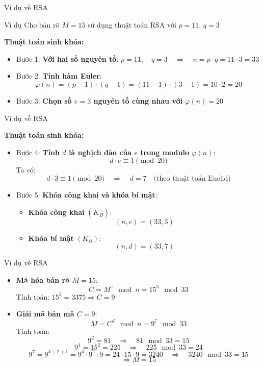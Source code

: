 \documentclass{beamer}
\begin{document}
\begin{frame}{Ví dụ về RSA}

\begin{block}{Ví dụ}
Cho bản rõ \(M = 15 \) sử dụng thuật toán RSA với \(p = 11 \), \(q = 3 \)
\end{block}

\textbf{Thuật toán sinh khóa:}

\begin{itemize}
\item Bước 1: \textbf{Với hai số nguyên tố}:
$p = 11, \quad q = 3 \quad \Rightarrow \quad n = p \cdot q = 11 \cdot 3 = 33$
\item Bước 2: \textbf{Tính hàm Euler}:
\[
\varphi(n) = (p - 1) \cdot (q - 1) = (11 - 1) \cdot (3 - 1) = 10 \cdot 2 = 20
\]
\item Bước 3: \textbf{Chọn số $e = 3$ nguyên tố cùng nhau với $\varphi(n) = 20$}
\end{itemize}

\end{frame}
\begin{frame}{Ví dụ về RSA}

\textbf{Thuật toán sinh khóa:}

\begin{itemize}

\item Bước 4: \textbf{Tính $d$ là nghịch đảo của $e$ trong modulo $\varphi(n)$}:
\[
d \cdot e \equiv 1 \pmod{20}
\]
Ta có:
\[
d \cdot 3 \equiv 1 \pmod{20} \quad \Rightarrow \quad d = 7 \quad \text{(theo thuật toán Euclid)}
\]

\item Bước 5: \textbf{Khóa công khai và khóa bí mật}:
\begin{itemize}
\item \textbf{Khóa công khai} $(K_B^+)$:
\[
(n, e) = (33, 3)
\]
\item \textbf{Khóa bí mật} $(K_B^-)$:
\[
(n, d) = (33, 7)
\]
\end{itemize}
\end{itemize}
\end{frame}
\begin{frame}{Ví dụ về RSA}

\begin{itemize}

\item \textbf{Mã hóa bản rõ $M = 15$}:
\[
C = M^e \mod n = 15^3 \mod 33
\]
Tính toán:
$15^3 = 3375 \Rightarrow C = 9$

\item \textbf{Giải mã bản mã $C = 9$}:
\[
M = C^d \mod n = 9^7 \mod 33
\]
Tính toán:
\[
9^2 = 81 \quad \Rightarrow \quad 81 \mod 33 = 15
\]
\[
9^4 = 15^2 = 225 \quad \Rightarrow \quad 225 \mod 33 = 24
\]
\[
9^7 = 9^{4+2+1} = 9^4 \cdot 9^2 \cdot 9 = 24 \cdot 15 \cdot 9 = 3240 \quad \Rightarrow \quad 3240 \mod 33 = 15
\]
\[
\Rightarrow M = 15
\]

\end{itemize}
\end{frame}
\end{document}
